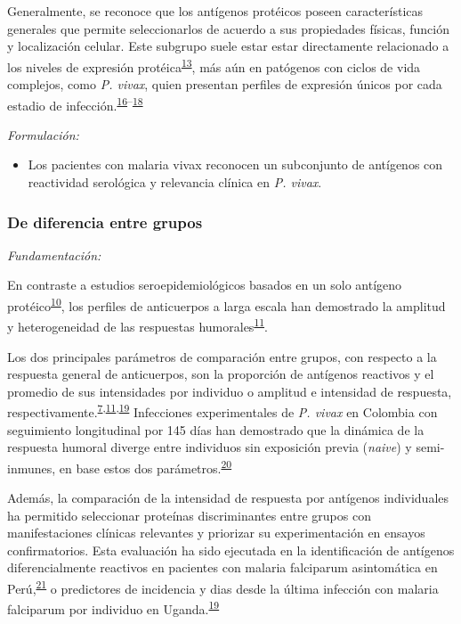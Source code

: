 \documentclass[]{article}
\providecommand{\tightlist}{%
  \setlength{\itemsep}{0pt}\setlength{\parskip}{0pt}}
\begin{document}
Generalmente, se reconoce que los antígenos protéicos poseen
características generales que permite seleccionarlos de acuerdo a sus
propiedades físicas, función y localización celular. Este subgrupo suele
estar estar directamente relacionado a los niveles de expresión
protéica\textsuperscript{\protect\hyperlink{ref-vigil2010}{13}}, más aún
en patógenos con ciclos de vida complejos, como \emph{P. vivax}, quien
presentan perfiles de expresión únicos por cada estadio de
infección.\textsuperscript{\protect\hyperlink{ref-bozdech2008}{16}--\protect\hyperlink{ref-bozdech2016}{18}}

\emph{Formulación:}

\begin{itemize}
\tightlist
\item
  Los pacientes con malaria vivax reconocen un subconjunto de antígenos
  con reactividad serológica y relevancia clínica en \emph{P. vivax}.
\end{itemize}

\subsubsection{De diferencia entre
grupos}\label{de-diferencia-entre-grupos}

\emph{Fundamentación:}

En contraste a estudios seroepidemiológicos basados en un solo antígeno
protéico\textsuperscript{\protect\hyperlink{ref-cutts2014meta}{10}}, los
perfiles de anticuerpos a larga escala han demostrado la amplitud y
heterogeneidad de las respuestas
humorales\textsuperscript{\protect\hyperlink{ref-crompton2010}{11}}.

Los dos principales parámetros de comparación entre grupos, con respecto
a la respuesta general de anticuerpos, son la proporción de antígenos
reactivos y el promedio de sus intensidades por individuo o amplitud e
intensidad de respuesta,
respectivamente.\textsuperscript{\protect\hyperlink{ref-King2015FOC}{7},\protect\hyperlink{ref-crompton2010}{11},\protect\hyperlink{ref-Helb2015exposure}{19}}
Infecciones experimentales de \emph{P. vivax} en Colombia con
seguimiento longitudinal por 145 días han demostrado que la dinámica de
la respuesta humoral diverge entre individuos sin exposición previa
(\emph{naive}) y semi-inmunes, en base estos dos
parámetros.\textsuperscript{\protect\hyperlink{ref-arevalo2016}{20}}

Además, la comparación de la intensidad de respuesta por antígenos
individuales ha permitido seleccionar proteínas discriminantes entre
grupos con manifestaciones clínicas relevantes y priorizar su
experimentación en ensayos confirmatorios. Esta evaluación ha sido
ejecutada en la identificación de antígenos diferencialmente reactivos
en pacientes con malaria falciparum asintomática en
Perú,\textsuperscript{\protect\hyperlink{ref-Torres2014asymptomatic}{21}}
o predictores de incidencia y dias desde la última infección con malaria
falciparum por individuo en
Uganda.\textsuperscript{\protect\hyperlink{ref-Helb2015exposure}{19}}
\end{document}

